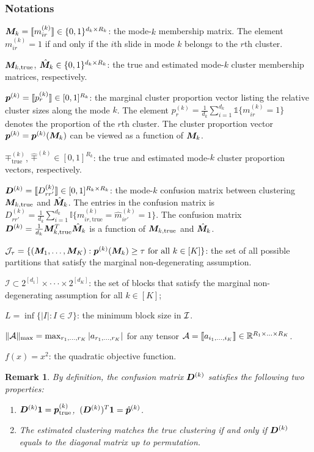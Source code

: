 \documentclass{article}
\newtheorem{remark}{Remark}
\begin{document}
\begin{appendices}
\subsubsection{Notations}\label{sec:notations}
$\bm M_{k}= \llbracket m_{ir}^{(k)} \rrbracket \in \{0,1\}^{d_k\times R_k}$: the mode-$k$ membership matrix. The element $m_{ir}^{(k)}=1$ if and only if the $i$th slide in mode $k$ belongs to the $r$th cluster.


$\bm M_{k,\text{true}}$, $\hat {\bm M}_{k} \in \{0,1\}^{d_k\times R_k}$: the true and estimated mode-$k$ cluster membership matrices, respectively.


$\bm{p}^{(k)} = \llbracket p^{(k)}_r \rrbracket \in [0,1]^{R_k}$: the marginal cluster proportion vector listing the relative cluster sizes along the mode $k$. The element $p_{r}^{(k)}=\frac{1}{d_k}\sum_{i=1}^{d_k}\mathds{1}\{m_{ir}^{(k)}=1\}$ denotes the proportion of the $r$th cluster. The cluster proportion vector $\bm{p}^{(k)}=\bm{p}^{(k)}(\bm M_k)$ can be viewed as a function of $\bm M_{k}$.

$ \mp^{(k)}_{\text{true}}$, $\hat \mp^{(k)} \in [0,1]^{R_k}$: the true and estimated mode-$k$ cluster proportion vectors, respectively.


$\bm{D}^{(k)} = \llbracket D^{(k)}_{rr'} \rrbracket\in [0,1]^{R_k\times R_k}$: the mode-$k$ confusion matrix between clustering $\bm M_{k,\text{true}}$ and $\hat {\bm M}_{k}$. The entries in the confusion matrix is $D_{rr'}^{(k)}=\frac{1}{d_k}\sum_{i=1}^{d_k}\mathbb{I}\{m_{ir,\text{true}}^{(k)}=\hat m_{ir'}^{(k)}=1\}$. The confusion matrix $\bm{D}^{(k)}={1\over d_k}\bm M^T_{k,\text{true}}\hat {\bm M}_k$ is a function of $\bm M_{k,\text{true}}$ and $\hat {\bm M}_k$.

$\mathcal{J}_{\tau}=\{(\bm M_1,\ldots,\bm M_K): \bm{p}^{(k)}(\bm M_k)\geq \tau \text{ for all } k\in[K]\}$: the set of all possible partitions that satisfy the marginal non-degenerating assumption. 

$\mathcal{I} \subset 2^{[d_1]}\times \cdot\cdot\cdot \times 2^{[d_K]}$: the set of blocks that satisfy the marginal non-degenerating assumption for all $k\in[K]$;

$L=\inf\{|I|: I\in\mathcal{I}\}$: the minimum block size in $\mathcal{I}$. 

$\lVert\mathcal{A}\rVert_{\max}=\max_{r_1,\ldots,r_K}|a_{r_1,\ldots,r_K}|$ for any tensor $\mathcal{A}=\llbracket a_{i_1,\ldots,i_K} \rrbracket\in\mathbb{R}^{R_1\times\ldots \times R_K}$.

$f(x)=x^2$: the quadratic objective function. 

\begin{remark}
By definition, the confusion matrix $\bm{D}^{(k)}$ satisfies the following two properties:
\begin{enumerate}
\item $\bm{D}^{(k)}\boldsymbol{1}=\bm{p}^{(k)}_{\text{true}}$,\ $(\bm{D}^{(k)})^T\boldsymbol{1} =\hat {\bm{p}}^{(k)}$.
\item The estimated clustering matches the true clustering if and only if $\bm{D}^{(k)}$ equals to the diagonal matrix up to permutation. 
\end{enumerate}
\end{remark}



\end{appendices}
\end{document}
